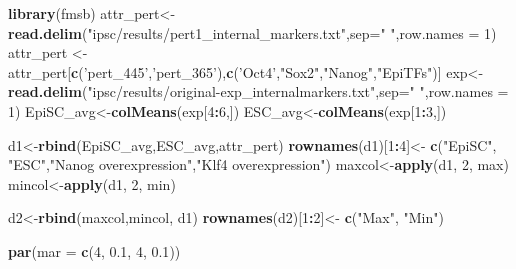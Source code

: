 \documentclass[
]{book}
\newenvironment{Shaded}{\begin{snugshade}}{\end{snugshade}}
\newcommand{\DataTypeTok}[1]{\textcolor[rgb]{0.13,0.29,0.53}{#1}}
\newcommand{\DecValTok}[1]{\textcolor[rgb]{0.00,0.00,0.81}{#1}}
\newcommand{\FloatTok}[1]{\textcolor[rgb]{0.00,0.00,0.81}{#1}}
\newcommand{\KeywordTok}[1]{\textcolor[rgb]{0.13,0.29,0.53}{\textbf{#1}}}
\newcommand{\NormalTok}[1]{#1}
\newcommand{\OperatorTok}[1]{\textcolor[rgb]{0.81,0.36,0.00}{\textbf{#1}}}
\newcommand{\StringTok}[1]{\textcolor[rgb]{0.31,0.60,0.02}{#1}}
\begin{document}
\begin{Shaded}
\begin{Highlighting}[]
\KeywordTok{library}\NormalTok{(fmsb)}
\NormalTok{attr_pert<-}\KeywordTok{read.delim}\NormalTok{(}\StringTok{"ipsc/results/pert1_internal_markers.txt"}\NormalTok{,}\DataTypeTok{sep=}\StringTok{" "}\NormalTok{,}\DataTypeTok{row.names =} \DecValTok{1}\NormalTok{)}
\NormalTok{attr_pert <-attr_pert[}\KeywordTok{c}\NormalTok{(}\StringTok{'pert_445'}\NormalTok{,}\StringTok{'pert_365'}\NormalTok{),}\KeywordTok{c}\NormalTok{(}\StringTok{'Oct4'}\NormalTok{,}\StringTok{"Sox2"}\NormalTok{,}\StringTok{"Nanog"}\NormalTok{,}\StringTok{"EpiTFs"}\NormalTok{)]}
\NormalTok{exp<-}\KeywordTok{read.delim}\NormalTok{(}\StringTok{"ipsc/results/original-exp_internalmarkers.txt"}\NormalTok{,}\DataTypeTok{sep=}\StringTok{" "}\NormalTok{,}\DataTypeTok{row.names =} \DecValTok{1}\NormalTok{)}
\NormalTok{EpiSC_avg<-}\KeywordTok{colMeans}\NormalTok{(exp[}\DecValTok{4}\OperatorTok{:}\DecValTok{6}\NormalTok{,])}
\NormalTok{ESC_avg<-}\KeywordTok{colMeans}\NormalTok{(exp[}\DecValTok{1}\OperatorTok{:}\DecValTok{3}\NormalTok{,])}

\NormalTok{d1<-}\KeywordTok{rbind}\NormalTok{(EpiSC_avg,ESC_avg,attr_pert)}
\KeywordTok{rownames}\NormalTok{(d1)[}\DecValTok{1}\OperatorTok{:}\DecValTok{4}\NormalTok{]<-}\StringTok{ }\KeywordTok{c}\NormalTok{(}\StringTok{"EpiSC"}\NormalTok{, }\StringTok{"ESC"}\NormalTok{,}\StringTok{"Nanog overexpression"}\NormalTok{,}\StringTok{"Klf4 overexpression"}\NormalTok{)}
\NormalTok{maxcol<-}\KeywordTok{apply}\NormalTok{(d1, }\DecValTok{2}\NormalTok{, max)}
\NormalTok{mincol<-}\KeywordTok{apply}\NormalTok{(d1, }\DecValTok{2}\NormalTok{, min)}

\NormalTok{d2<-}\KeywordTok{rbind}\NormalTok{(maxcol,mincol, d1)}
\KeywordTok{rownames}\NormalTok{(d2)[}\DecValTok{1}\OperatorTok{:}\DecValTok{2}\NormalTok{]<-}\StringTok{ }\KeywordTok{c}\NormalTok{(}\StringTok{"Max"}\NormalTok{, }\StringTok{"Min"}\NormalTok{)}

\KeywordTok{par}\NormalTok{(}\DataTypeTok{mar =} \KeywordTok{c}\NormalTok{(}\DecValTok{4}\NormalTok{, }\FloatTok{0.1}\NormalTok{, }\DecValTok{4}\NormalTok{, }\FloatTok{0.1}\NormalTok{))}



\end{Highlighting}
\end{Shaded}
\end{document}
